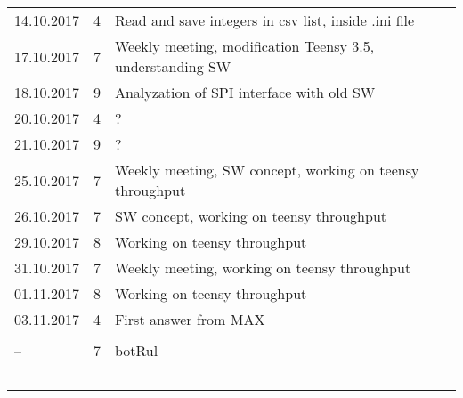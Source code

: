 \begin{table}[tp]
\begin{tabular}{lcl}
    14.10.2017 &		4 &			Read and save integers in csv list, inside .ini file \\
    17.10.2017 &		7 &			Weekly meeting, modification Teensy 3.5, understanding SW\\
    18.10.2017 &		9 &			Analyzation of SPI interface with old SW\\
    20.10.2017 &		4 &			?\\
    21.10.2017 &		9 &			?\\
    25.10.2017 &		7 &			Weekly meeting, SW concept, working on teensy throughput\\
    26.10.2017 &		7 &			SW concept, working on teensy throughput\\
    29.10.2017 &		8 &			Working on teensy throughput\\
    31.10.2017 &		7 &			Weekly meeting, working on teensy throughput\\
    01.11.2017 &		8 &			Working on teensy throughput\\
    03.11.2017 &		4 &			First answer from MAX\\
     																						\\\bottomrule
    -- &				7 & 			botRul \\\ 
  \end{tabular}
\end{table}
